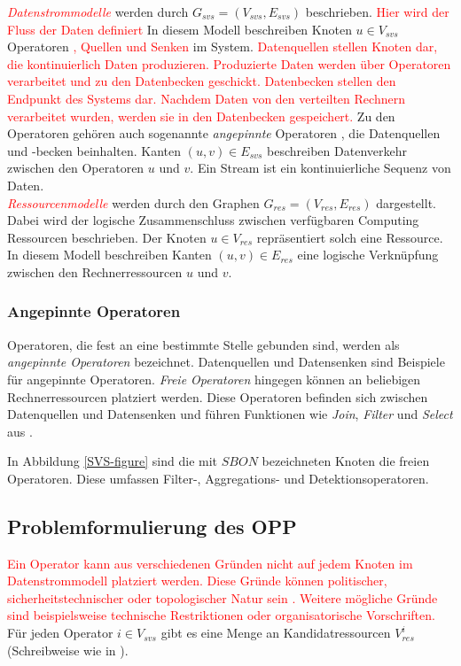 \documentclass{article}
\begin{document}
\textcolor{red}{\textit{Datenstrommodelle}} werden durch $G_{svs} = (V_{svs}, E_{svs})$ beschrieben. 
\textcolor{red}{Hier wird der Fluss der Daten definiert}
In diesem Modell beschreiben Knoten $u \in V_{svs}$ Operatoren \textcolor{red}{, Quellen und Senken} im System. 
\textcolor{red}{Datenquellen stellen Knoten dar, die kontinuierlich Daten produzieren. Produzierte Daten werden über Operatoren verarbeitet und zu den Datenbecken geschickt. 
Datenbecken stellen den Endpunkt des Systems dar. Nachdem Daten von den verteilten Rechnern verarbeitet wurden, werden sie in den Datenbecken gespeichert.} 
Zu den Operatoren gehören auch sogenannte \textit{angepinnte} Operatoren \cite{efficient-operator-placement}, 
die Datenquellen und -becken beinhalten. Kanten $(u,v) \in E_{svs}$ beschreiben Datenverkehr
zwischen den Operatoren $u$ und $v$.  Ein Stream ist ein kontinuierliche Sequenz von Daten. \\


\textcolor{red}{\textit{Ressourcenmodelle}} werden durch den Graphen $G_{res} = (V_{res}, E_{res})$ dargestellt. 
Dabei wird der logische Zusammenschluss zwischen verfügbaren Computing Ressourcen beschrieben. Der Knoten $u \in V_{res}$ 
repräsentiert solch eine Ressource. In diesem Modell beschreiben Kanten $(u,v) \in E_{res}$ 
eine logische Verknüpfung zwischen den Rechnerressourcen $u$ und $v$.


\subsubsection{Angepinnte Operatoren}
Operatoren, die fest an eine bestimmte Stelle gebunden sind, werden als \textit{angepinnte Operatoren} bezeichnet. 
Datenquellen und Datensenken sind Beispiele für angepinnte Operatoren. 
\textit{Freie Operatoren} hingegen können an beliebigen Rechnerressourcen platziert werden. Diese Operatoren befinden sich zwischen Datenquellen und Datensenken und führen 
Funktionen wie \textit{Join}, \textit{Filter} und \textit{Select} aus \cite{network-aware-op}.

In Abbildung \ref{SVS-figure} sind die mit $SBON$ bezeichneten Knoten die freien Operatoren. Diese umfassen Filter-, Aggregations- und Detektionsoperatoren.

\subsection{Problemformulierung des OPP} \label{OPP-Definition}
\textcolor{red}{Ein Operator kann aus verschiedenen Gründen nicht auf jedem Knoten im Datenstrommodell platziert werden. Diese Gründe können politischer, 
sicherheitstechnischer oder topologischer Natur sein \cite{cardellini-optimal_operatorplc}. 
Weitere mögliche Gründe sind beispielsweise technische Restriktionen oder organisatorische Vorschriften.}
Für jeden Operator $i \in V_{svs}$ gibt es eine Menge an Kandidatressourcen $V_{res}^i$ (Schreibweise wie in \cite{efficient-operator-placement}).
\end{document}
